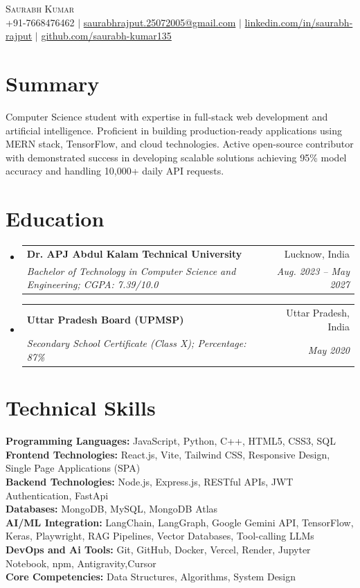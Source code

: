 \documentclass[letterpaper,11pt]{article}
\makeatletter
\newcommand{\resumeSubheading}[4]{
  \vspace{-2pt}\item
    \begin{tabular*}{0.97\textwidth}[t]{l@{\extracolsep{\fill}}r}
      \textbf{#1} & #2 \\
      \textit{\small#3} & \textit{\small #4} \\
    \end{tabular*}\vspace{-7pt}
}
\newcommand{\resumeSubHeadingListStart}{\begin{itemize}[leftmargin=0.15in, label={}]}
\newcommand{\resumeSubHeadingListEnd}{\end{itemize}}
\makeatother
\begin{document}
\begin{center}
    {\Huge \scshape Saurabh Kumar} \\ \vspace{4pt}
    \small
    +91-7668476462 $|$
    \href{mailto:saurabhrajput.25072005@gmail.com}{saurabhrajput.25072005@gmail.com} $|$
    \href{https://linkedin.com/in/saurabh-rajput}{linkedin.com/in/saurabh-rajput} $|$
    \href{https://github.com/saurabh-kumar135}{github.com/saurabh-kumar135}
\end{center}

\section{Summary}
\small{
Computer Science student with expertise in full-stack web development and artificial intelligence. Proficient in building production-ready applications using MERN stack, TensorFlow, and cloud technologies. Active open-source contributor with demonstrated success in developing scalable solutions achieving 95\% model accuracy and handling 10,000+ daily API requests.
}

\section{Education}
  \resumeSubHeadingListStart
    \resumeSubheading
      {Dr. APJ Abdul Kalam Technical University}{Lucknow, India}
      {Bachelor of Technology in Computer Science and Engineering; CGPA: 7.39/10.0}{Aug. 2023 -- May 2027}
    \resumeSubheading
      {Uttar Pradesh Board (UPMSP)}{Uttar Pradesh, India}
      {Secondary School Certificate (Class X); Percentage: 87\%}{May 2020}
  \resumeSubHeadingListEnd

\section{Technical Skills}
 \begin{itemize}[leftmargin=0.15in, label={}]
    \small{\item{
     \textbf{Programming Languages:}{ JavaScript, Python, C++, HTML5, CSS3, SQL} \\
     \textbf{Frontend Technologies:}{ React.js, Vite, Tailwind CSS, Responsive Design, Single Page Applications (SPA)} \\
     \textbf{Backend Technologies:}{ Node.js, Express.js, RESTful APIs, JWT Authentication, FastApi} \\
     \textbf{Databases:}{ MongoDB, MySQL, MongoDB Atlas} \\
     \textbf{AI/ML Integration:}{ LangChain, LangGraph, Google Gemini API, TensorFlow, Keras, Playwright, RAG Pipelines, Vector Databases, Tool-calling LLMs} \\
     \textbf{DevOps and Ai Tools:}{ Git, GitHub, Docker, Vercel, Render, Jupyter Notebook, npm, Antigravity,Cursor } \\
     \textbf{Core Competencies:}{ Data Structures, Algorithms, System Design}
    }}
 \end{itemize}
\end{document}
